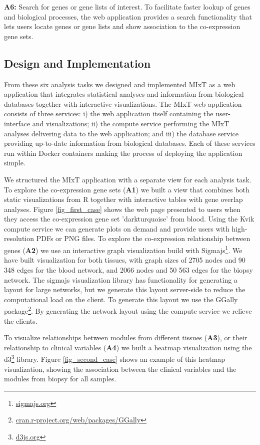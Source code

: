 \textbf{A6:} Search for genes or gene lists of interest. To facilitate faster lookup
of genes and biological processes, the web application provides a search
functionality that lets users locate genes or gene lists and show association to
the co-expression gene sets. 


\subsection*{Design and Implementation} 
From these six analysis tasks we designed and implemented MIxT as a web
application that integrates statistical analyses and information from biological
databases together with interactive visualizations.
The MIxT web application
consists of three services: i) the web application itself containing the
user-interface and visualizations; ii) the compute service performing the MIxT
analyses delivering data to the web application; and iii) the database service
providing up-to-date information from biological databases. Each of these
services run within Docker containers making the process of deploying the
application simple. 

We structured the MIxT application with a separate view for each analysis task.
To explore the co-expression gene sets (\textbf{A1}) we built a view that
combines both static visualizations from R together with interactive tables with
gene overlap analyses. Figure \ref{fig_first_case} shows the web page presented
to users when they access the co-expression gene set 'darkturquoise' from blood.
Using the Kvik compute service we can generate plots on demand and provide users
with high-resolution PDFs or PNG files. 
To explore the co-expression relationship between genes (\textbf{A2}) we use an
interactive graph visualization build with Sigmajs\footnote{\url{sigmajs.org}}.
We have built visualization for both tissues, with graph sizes of 2705 nodes and
90 348 edges for the blood network, and 2066 nodes and 50 563 edges for the
biopsy network. The sigmajs visualization library has functionality for
generating a layout for large networks, but we generate this layout server-side
to reduce the computational load on the client. To generate this layout we use
the GGally package\footnote{\url{cran.r-project.org/web/packages/GGally}}. By
generating the network layout using the compute service we relieve the clients.

To visualize relationships between modules from different tissues (\textbf{A3}), or their
relationship to clinical variables (\textbf{A4}) we built a heatmap
visualization using the d3\footnote{\url{d3js.org}} library. Figure
\ref{fig_second_case} shows an example of this heatmap visualization, showing
the association between the clinical variables and the modules from biopsy for
all samples.  

